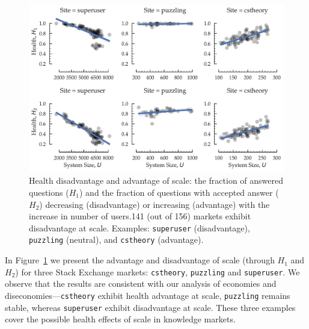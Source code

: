 \begin{figure}[hbt]
\vspace{-0.5\baselineskip}
\centering
\includegraphics[scale=0.39]{Figures/Size_vs_Health.pdf}
\vspace{-2\baselineskip}
\caption{Health disadvantage and advantage of scale: the fraction of answered questions ($H_1$) and the fraction of questions with accepted answer ($H_2$) decreasing (disadvantage) or increasing (advantage) with the increase in number of users.141 (out of 156) markets exhibit disadvantage at scale. Examples: \texttt{superuser} (disadvantage), \texttt{puzzling} (neutral), and \texttt{cstheory} (advantage).}
\vspace{-\baselineskip}
\label{fig:health}
\end{figure}

In Figure~\ref{fig:health} we present the advantage and disadvantage of scale (through $H_1$ and $H_2$) for three Stack Exchange markets: \texttt{cstheory}, \texttt{puzzling} and \texttt{superuser}. We observe that the results are consistent with our analysis of economies and diseconomies---\texttt{cstheory} exhibit health advantage at scale, \texttt{puzzling} remains stable, whereas \texttt{superuser} exhibit disadvantage at scale. These three examples cover the possible health effects of scale in knowledge markets. 


